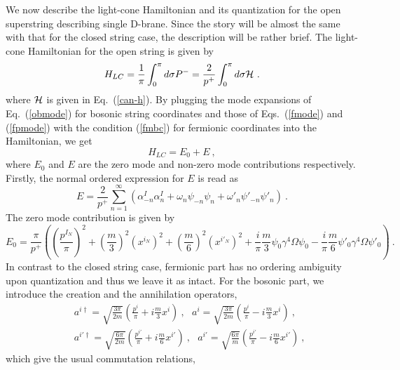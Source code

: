 \documentclass[a4paper,12pt]{article}
\begin{document}
We now describe the light-cone Hamiltonian and its quantization for
the open superstring describing single D-brane.  Since the story will
be almost the same with that for the closed string case, the
description will be rather brief.  The light-cone Hamiltonian for the
open string is given by
\begin{equation}
H_{LC} = \frac{1}{\pi} \int^\pi_0 d \sigma P^-
       = \frac{2}{p^+} \int^\pi_0 d \sigma {\cal H} ~.
\end{equation}
where ${\cal H}$ is given in Eq.~(\ref{can-h}).  By plugging the mode
expansions of Eq.~(\ref{obmode}) for bosonic string coordinates and
those of Eqs.~(\ref{fmode}) and (\ref{fpmode}) with the condition
(\ref{fmbc}) for fermionic coordinates into the Hamiltonian, we get
\begin{equation}
H_{LC} = E_0 + E ~,
\end{equation}
where $E_0$ and $E$ are the zero mode and non-zero mode contributions
respectively.  Firstly, the normal ordered expression for $E$ is read
as
\begin{equation}
E = \frac{2}{p^+} \sum^\infty_{n =1} 
  ( \alpha^I_{-n} \alpha^I_n  
   + \omega_n \psi_{-n} \psi_n
   + \omega'_n \psi'_{-n} \psi'_n
  ) ~.
\end{equation}
The zero mode contribution is given by
\begin{equation}
E_0 = \frac{\pi}{p^+} 
  \left( \left( \frac{p^{I_N}}{\pi} \right)^2 
       + \left( \frac{m}{3} \right)^2 (x^{i_N})^2
       + \left( \frac{m}{6} \right)^2 (x^{i'_N})^2
       + \frac{i}{\pi} \frac{m}{3} \psi_0 \gamma^4 \Omega \psi_0
       - \frac{i}{\pi} \frac{m}{6} \psi'_0 \gamma^4 \Omega \psi'_0
  \right) ~.
\end{equation}
In contrast to the closed string case, fermionic part has no ordering
ambiguity upon quantization and thus we leave it as intact.  For the
bosonic part, we introduce the creation and the annihilation operators,
\begin{eqnarray}
& & a^{i \dagger} = \sqrt{ \frac{3 \pi}{2m} }  
      \left( \frac{p^i}{\pi} + i \frac{m}{3} x^i \right)~,
 ~~~a^i = \sqrt{ \frac{3 \pi}{2m} }
      \left( \frac{p^i}{\pi} - i \frac{m}{3} x^i \right)~,
  \nonumber \\
& & a^{i' \dagger} = \sqrt{ \frac{6 \pi}{2m} }
      \left( \frac{p^{i'}}{\pi} + i \frac{m}{6} x^{i'} \right)~,
 ~~~a^{i'} = \sqrt{ \frac{6 \pi}{m} }
      \left( \frac{p^{i'}}{\pi} - i \frac{m}{6} x^{i'} \right) ~,
\end{eqnarray}
which give the usual commutation relations,
\end{document}
